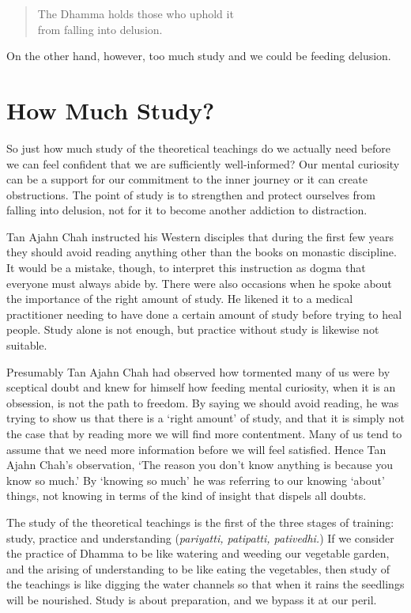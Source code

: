 \begin{quote}
  The Dhamma holds those who uphold it\\
  from falling into delusion.
\end{quote}

On the other hand, however, too much study and we could be feeding
delusion.

\section{How Much Study?}

So just how much study of the theoretical teachings do we actually need
before we can feel confident that we are sufficiently well-informed? Our
mental curiosity can be a support for our commitment to the inner
journey or it can create obstructions. The point of study is to
strengthen and protect ourselves from falling into delusion, not for it
to become another addiction to distraction.

Tan Ajahn Chah instructed his Western disciples that during the first
few years they should avoid reading anything other than the books on
monastic discipline. It would be a mistake, though, to interpret this
instruction as dogma that everyone must always abide by. There were also
occasions when he spoke about the importance of the right amount of
study. He likened it to a medical practitioner needing to have done a
certain amount of study before trying to heal people. Study alone is not
enough, but practice without study is likewise not suitable.

Presumably Tan Ajahn Chah had observed how tormented many of us were by
sceptical doubt and knew for himself how feeding mental curiosity, when
it is an obsession, is not the path to freedom. By saying we should
avoid reading, he was trying to show us that there is a `right amount'
of study, and that it is simply not the case that by reading more we
will find more contentment. Many of us tend to assume that we need more
information before we will feel satisfied. Hence Tan Ajahn Chah's
observation, `The reason you don't know anything is because you know so
much.' By `knowing so much' he was referring to our knowing `about'
things, not knowing in terms of the kind of insight that dispels all
doubts.

The study of the theoretical teachings is the first of the three stages
of training: study, practice and understanding (\emph{pariyatti,
patipatti, pativedhi.}) If we consider the practice of Dhamma to be like
watering and weeding our vegetable garden, and the arising of
understanding to be like eating the vegetables, then study of the
teachings is like digging the water channels so that when it rains the
seedlings will be nourished. Study is about preparation, and we bypass
it at our peril.

